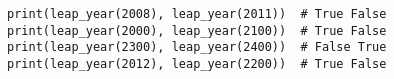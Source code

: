 \documentclass[../main.tex]{subfiles}
\begin{document}
\begin{enumerate}
\begin{verbatim}
print(leap_year(2008), leap_year(2011))  # True False
print(leap_year(2000), leap_year(2100))  # True False
print(leap_year(2300), leap_year(2400))  # False True
print(leap_year(2012), leap_year(2200))  # True False
\end{verbatim}
%
%
%


\end{enumerate}
\end{document}
